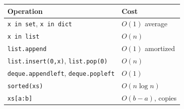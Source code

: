 \begin{keybox}
\begin{center}
\begin{tabular}{ll}
\toprule
\textbf{Operation} & \textbf{Cost} \\
\midrule
\texttt{x in set}, \texttt{x in dict}   & $O(1)$ average \\
\texttt{x in list}                      & $O(n)$ \\
\texttt{list.append}                    & $O(1)$ amortized \\
\texttt{list.insert(0,x)}, \texttt{list.pop(0)} & $O(n)$ \\
\texttt{deque.appendleft}, \texttt{deque.popleft} & $O(1)$ \\
\texttt{sorted(xs)}                     & $O(n \log n)$ \\
\texttt{xs[a:b]}                        & $O(b-a)$, copies \\
\bottomrule
\end{tabular}
\end{center}
\end{keybox}
